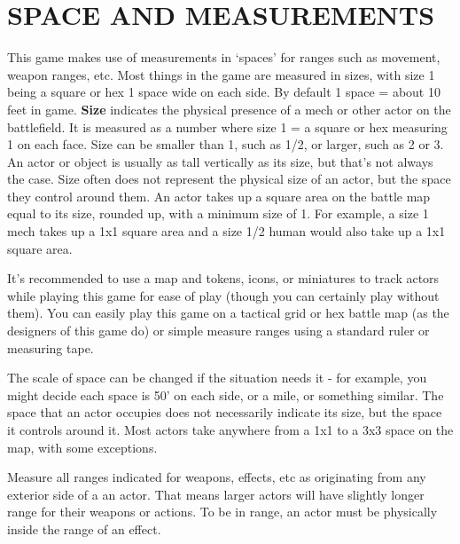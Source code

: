 \section{SPACE AND MEASUREMENTS}

This game makes use of measurements in ‘spaces’ for ranges such as movement, weapon
ranges, etc. Most things in the game are measured in sizes, with size 1 being a square or hex 1
space wide on each side. By default 1 space = about 10 feet in game. \textbf{Size} indicates the physical
presence of a mech or other actor on the battlefield. It is measured as a number where size 1 = a
square or hex measuring 1 on each face. Size can be smaller than 1, such as 1/2, or larger, such
as 2 or 3. An actor or object is usually as tall vertically as its size, but that’s not always the case.
Size often does not represent the physical size of an actor, but the space they control around
them. An actor takes up a square area on the battle map equal to its size, rounded up, with a
minimum size of 1. For example, a size 1 mech takes up a 1x1 square area and a size 1/2 human
would also take up a 1x1 square area.

It’s recommended to use a map and tokens, icons, or miniatures to track actors while playing this
game for ease of play (though you can certainly play without them). You can easily play this game
on a tactical grid or hex battle map (as the designers of this game do) or simple measure ranges
using a standard ruler or measuring tape.

The scale of space can be changed if the situation needs it - for example, you might decide each
space is 50’ on each side, or a mile, or something similar. The space that an actor occupies does
not necessarily indicate its size, but the space it controls around it. Most actors take anywhere
from a 1x1 to a 3x3 space on the map, with some exceptions.

Measure all ranges indicated for weapons, effects, etc as originating from any exterior side of a
an actor. That means larger actors will have slightly longer range for their weapons or actions. To
be in range, an actor must be physically inside the range of an effect.